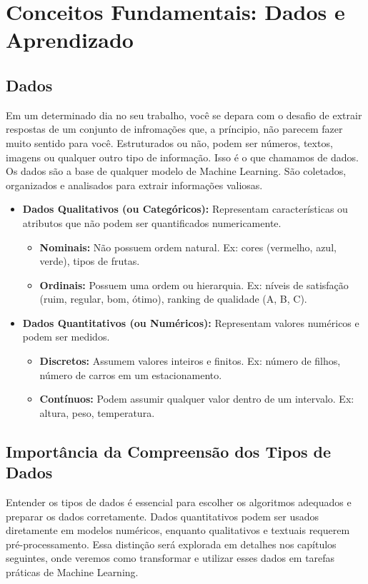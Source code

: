 \documentclass[a4paper,12pt,openany]{book}
\begin{document}
\chapter{Conceitos Fundamentais: Dados e Aprendizado}

\section{Dados}
Em um determinado dia no seu trabalho, você se depara com o desafio de extrair respostas de um conjunto de infromações que, a príncipio, não parecem fazer
muito sentido para você. Estruturados ou não, podem ser números, textos, imagens ou qualquer outro tipo de informação. Isso é o que chamamos de dados.
Os dados são a base de qualquer modelo de Machine Learning. São coletados, organizados e analisados para extrair informações valiosas.

\begin{itemize}
    \item \textbf{Dados Qualitativos (ou Categóricos):} Representam características ou atributos que não podem ser quantificados numericamente.
    \begin{itemize}
        \item \textbf{Nominais:} Não possuem ordem natural. Ex: cores (vermelho, azul, verde), tipos de frutas.
        \item \textbf{Ordinais:} Possuem uma ordem ou hierarquia. Ex: níveis de satisfação (ruim, regular, bom, ótimo), ranking de qualidade (A, B, C).
    \end{itemize}

    \item \textbf{Dados Quantitativos (ou Numéricos):} Representam valores numéricos e podem ser medidos.
    \begin{itemize}
        \item \textbf{Discretos:} Assumem valores inteiros e finitos. Ex: número de filhos, número de carros em um estacionamento.
        \item \textbf{Contínuos:} Podem assumir qualquer valor dentro de um intervalo. Ex: altura, peso, temperatura.
    \end{itemize}
\end{itemize}

\section{Importância da Compreensão dos Tipos de Dados}
Entender os tipos de dados é essencial para escolher os algoritmos adequados e preparar os dados corretamente. 
Dados quantitativos podem ser usados diretamente em modelos numéricos, enquanto qualitativos e textuais requerem pré-processamento. Essa distinção será 
explorada em detalhes nos capítulos seguintes, onde veremos como transformar e utilizar esses dados em tarefas práticas de Machine Learning.
\end{document}
